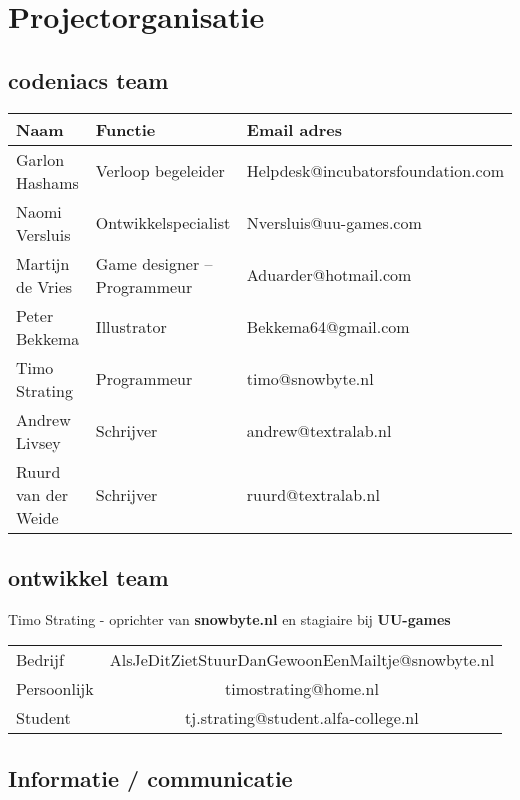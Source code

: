 \documentclass[]{report}
\begin{document}
\chapter{Projectorganisatie}

\section{codeniacs team}
\begin{tabular}{ l l l }
	\textbf{Naam} & \textbf{Functie} & \textbf{Email adres} \\ \hline
	Garlon Hashams 			& Verloop begeleider				& Helpdesk@incubatorsfoundation.com \\ 
	Naomi Versluis 			& Ontwikkelspecialist 				& Nversluis@uu-games.com \\
	Martijn de Vries 		& Game designer – Programmeur 			& Aduarder@hotmail.com \\
	Peter Bekkema			& Illustrator					& Bekkema64@gmail.com \\
	Timo Strating 			& Programmeur 					& timo@snowbyte.nl \\
	Andrew Livsey 			& Schrijver					& andrew@textralab.nl \\
	Ruurd van der Weide		& Schrijver					& ruurd@textralab.nl \\
\end{tabular}


\section{ontwikkel team}
\begin{center}
	Timo Strating - oprichter van \textbf{snowbyte.nl} en stagiaire bij \textbf{UU-games}
\end{center}	

\begin{center}
	\begin{tabular}{ l c }
		Bedrijf & AlsJeDitZietStuurDanGewoonEenMailtje@snowbyte.nl \\
		Persoonlijk & timostrating@home.nl  \\
		Student & tj.strating@student.alfa-college.nl \\
	\end{tabular}
\end{center}


\section{Informatie / communicatie}
\end{document}
